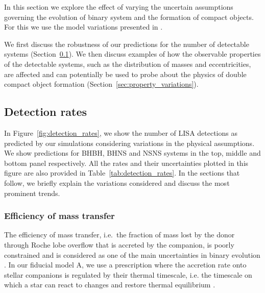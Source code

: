 In this section we explore the effect of varying the uncertain assumptions governing the evolution of binary system and the formation of compact objects. For this we use the model variations presented in \citet{Broekgaarden+2021}. 

We first discuss the robustness of our predictions for the number of detectable systems (Section~\ref{sec:detection_rate_analysis}). We then discuss examples of how the observable properties of the detectable systems, such as the distribution of masses and eccentricities, are affected and can potentially be used to probe about the physics of double compact object formation (Section~\ref{sec:property_variations}).


\subsection{Detection rates}\label{sec:detection_rate_analysis}
In Figure~\ref{fig:detection_rates}, we show the number of LISA detections as predicted by our simulations considering variations in the physical assumptions.  We show predictions for  BHBH, BHNS and NSNS systems in the top, middle and bottom panel respectively. All the rates and their uncertainties plotted in this figure are also provided in Table~\ref{tab:detection_rates}. 
In the sections that follow, we briefly explain the variations considered and discuss the most prominent trends. 


\subsubsection{Efficiency of mass transfer}

The efficiency of mass transfer, i.e.\ the fraction of mass lost by the donor through Roche lobe overflow that is accreted by the companion, is poorly constrained and is considered as one of the main uncertainties in binary evolution \citep[e.g.\ ][]{deMink+2007}. In our fiducial model A, we use a prescription where the 
accretion rate onto stellar companions is regulated by their thermal timescale, i.e. the timescale on which a star can react to changes and restore thermal equilibrium \citep[see e.g.\ ][]{Schneider+2015}. 

